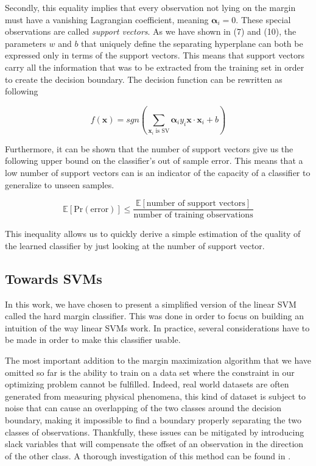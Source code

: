 Secondly, this equality implies that every observation not lying on the margin must have a vanishing Lagrangian coefficient, meaning $\boldsymbol{\alpha}_i = 0$. These special observations are called \textit{support vectors}. As we have shown in (7) and (10), the parameters $w$ and $b$ that uniquely define the separating hyperplane can both be expressed only in terms of the support vectors. This means that support vectors carry all the information that was to be extracted from the training set in order to create the decision boundary. The decision function can be rewritten as following

\begin{equation}
  f(\mathbf{x}) = sgn\left(\sum_{\mathbf{x}_i \text{ is SV}}\boldsymbol{\alpha}_iy_i\mathbf{x} \cdot \mathbf{x}_i + b\right)
\end{equation}

Furthermore, it can be shown \cite{Vapnik:1995:NSL:211359} that the number of support vectors give us the following upper bound on the classifier's out of sample error. This means that a low number of support vectors can is an indicator of the capacity of a classifier to generalize to unseen samples. 

\begin{equation}
  \mathbb{E}\left[\text{Pr}\left(\text{error}\right)\right] \leq \frac{\mathbb{E}\left[\text{number of support vectors}\right]}{\text{number of training observations}}
\end{equation}

This inequality allows us to quickly derive a simple estimation of the quality of the learned classifier by just looking at the number of support vector.

\subsection{Towards SVMs}

In this work, we have chosen to present a simplified version of the linear SVM called the hard margin classifier. This was done in order to focus on building an intuition of the way linear SVMs work. In practice, several considerations have to be made in order to make this classifier usable.

The most important addition to the margin maximization algorithm that we have omitted so far is the ability to train on a data set where the constraint in our optimizing problem cannot be fulfilled. Indeed, real world datasets are often generated from measuring physical phenomena, this kind of dataset is subject to noise that can cause an overlapping of the two classes around the decision boundary, making it impossible to find a boundary properly separating the two classes of observations. Thankfully, these issues can be mitigated by introducing slack variables that will compensate the offset of an observation in the direction of the other class. A thorough investigation of this method can be found in \cite{Schoelkopf95extractingsupport}.

